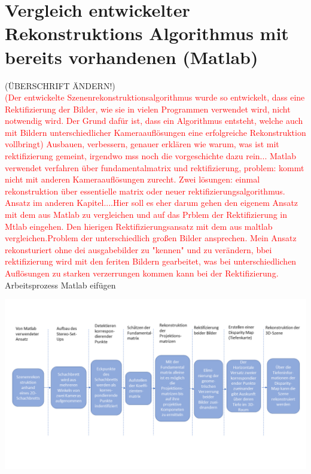\chapter{Vergleich entwickelter Rekonstruktions Algorithmus mit bereits vorhandenen (Matlab)}
\label{sec:rectification}

(ÜBERSCHRIFT ÄNDERN!)\\

\textcolor{red}{(Der entwickelte Szenenrekonstruktionsalgorithmus wurde so entwickelt, dass eine Rektifizierung der Bilder, wie sie in vielen Programmen verwendet wird, nicht notwendig wird. Der Grund dafür ist, dass ein Algorithmus entsteht, welche auch mit Bildern unterschiedlicher Kameraauflösungen eine erfolgreiche Rekonstruktion vollbringt) Ausbauen, verbessern, genauer erklären wie warum, was ist mit rektifizierung gemeint, irgendwo mss noch die vorgeschichte dazu rein... Matlab verwendet verfahren über fundamentalmatrix und rektifizierung, problem: kommt nicht mit anderen Kameraauflösungen zurecht. Zwei lösungen: einmal rekonstruktion über essentielle matrix oder neuer rektifizierungsalgorithmus. Ansatz im anderen Kapitel....Hier soll es eher darum gehen den eigenem Ansatz mit dem aus Matlab zu vergleichen und auf das Prblem der Rektifizierung in Mtlab eingehen. Den hierigen Rektifizierungsansatz mit dem aus maltlab vergleichen.Problem der unterschiedlich großen Bilder ansprechen. Mein Ansatz rekonsturiert ohne dei ausgabebilder zu "kennen" und zu verändern, bbei rektifizierung wird mit den feriten Bildern gearbeitet, was bei unterschiedlichen Auflösungen zu starken verzerrungen kommen kann bei der Rektifizierung.}\\







Arbeitsprozess Matlab eifügen 

\begin{minipage}{\linewidth}
	\centering
	\includegraphics[width=0.8\linewidth]{images/ArbeitsProzessRealunkalibriert.png}
\end{minipage}\\ 



